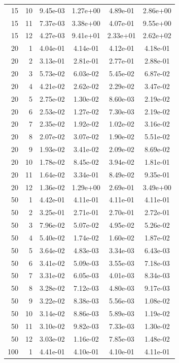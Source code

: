 \begin{longtable}{r r S[table-format=1.2e-2] S[table-format=1.2e-2] S[table-format=1.2e-2] S[table-format=1.2e-2]}
15 & 10 & 9.45e-03 & 1.27e+00 & 4.89e-01 & 2.86e+00 \\
15 & 11 & 7.37e-03 & 3.38e+00 & 4.07e-01 & 9.55e+00 \\
15 & 12 & 4.27e-03 & 9.41e+01 & 2.33e+01 & 2.62e+02 \\
20 & 1 & 4.04e-01 & 4.14e-01 & 4.12e-01 & 4.18e-01 \\
20 & 2 & 3.13e-01 & 2.81e-01 & 2.77e-01 & 2.88e-01 \\
20 & 3 & 5.73e-02 & 6.03e-02 & 5.45e-02 & 6.87e-02 \\
20 & 4 & 4.21e-02 & 2.62e-02 & 2.29e-02 & 3.47e-02 \\
20 & 5 & 2.75e-02 & 1.30e-02 & 8.60e-03 & 2.19e-02 \\
20 & 6 & 2.53e-02 & 1.27e-02 & 7.30e-03 & 2.19e-02 \\
20 & 7 & 2.35e-02 & 1.92e-02 & 1.02e-02 & 3.16e-02 \\
20 & 8 & 2.07e-02 & 3.07e-02 & 1.90e-02 & 5.51e-02 \\
20 & 9 & 1.93e-02 & 3.41e-02 & 2.09e-02 & 8.69e-02 \\
20 & 10 & 1.78e-02 & 8.45e-02 & 3.94e-02 & 1.81e-01 \\
20 & 11 & 1.64e-02 & 3.34e-01 & 8.49e-02 & 9.35e-01 \\
20 & 12 & 1.36e-02 & 1.29e+00 & 2.69e-01 & 3.49e+00 \\
50 & 1 & 4.42e-01 & 4.11e-01 & 4.11e-01 & 4.11e-01 \\
50 & 2 & 3.25e-01 & 2.71e-01 & 2.70e-01 & 2.72e-01 \\
50 & 3 & 7.96e-02 & 5.07e-02 & 4.95e-02 & 5.26e-02 \\
50 & 4 & 5.40e-02 & 1.74e-02 & 1.60e-02 & 1.87e-02 \\
50 & 5 & 3.64e-02 & 4.83e-03 & 3.34e-03 & 6.43e-03 \\
50 & 6 & 3.41e-02 & 5.09e-03 & 3.55e-03 & 7.18e-03 \\
50 & 7 & 3.31e-02 & 6.05e-03 & 4.01e-03 & 8.34e-03 \\
50 & 8 & 3.28e-02 & 7.12e-03 & 4.80e-03 & 9.17e-03 \\
50 & 9 & 3.22e-02 & 8.38e-03 & 5.56e-03 & 1.08e-02 \\
50 & 10 & 3.14e-02 & 8.86e-03 & 5.89e-03 & 1.19e-02 \\
50 & 11 & 3.10e-02 & 9.82e-03 & 7.33e-03 & 1.30e-02 \\
50 & 12 & 3.03e-02 & 1.16e-02 & 7.85e-03 & 1.48e-02 \\
100 & 1 & 4.41e-01 & 4.10e-01 & 4.10e-01 & 4.11e-01 \\

\end{longtable}
